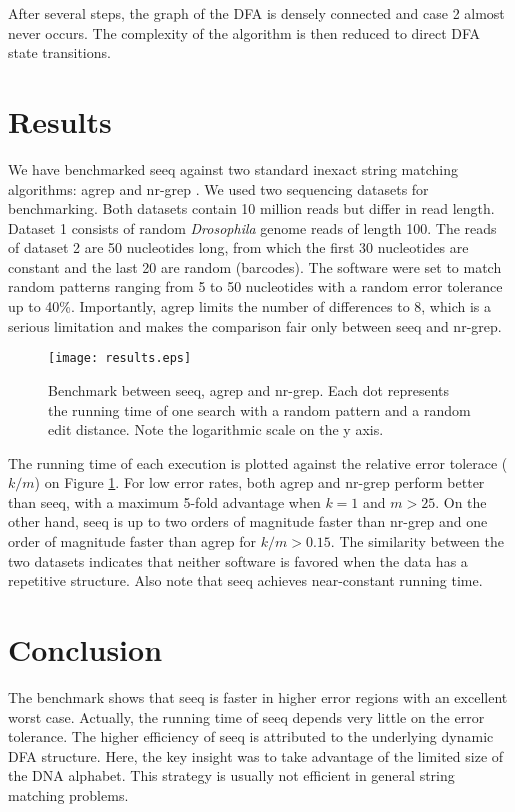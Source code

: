 \documentclass{bioinfo}
\begin{document}
\begin{methods}
After several steps, the graph of the DFA is densely connected and
case 2 almost never occurs. The complexity of the algorithm is then
reduced to direct DFA state transitions.

\end{methods}

\section{Results}

We have benchmarked seeq against two standard inexact string
matching algorithms: agrep \citep{Wu92} and nr-grep \citep{Nav01}. We
used two sequencing datasets for benchmarking. Both datasets contain
10 million reads but differ in read length. Dataset 1 consists of random
\textit{Drosophila} genome reads of length 100. The reads of dataset 2
are 50 nucleotides long, from which the first 30 nucleotides are constant
and the last 20 are random (barcodes). The software were set to match
random patterns ranging from 5 to 50 nucleotides with a random error
tolerance up to 40\%. Importantly, agrep limits the number of differences
to 8, which is a serious limitation and makes the comparison fair only
between seeq and nr-grep.

\begin{figure}[!tpb]
\centerline{\texttt{[image: results.eps]}}
\caption{Benchmark between seeq, agrep and nr-grep. Each dot represents
the running time of one search with a random pattern and a random
edit distance. Note the logarithmic scale on the y axis.}
\label{fig:results}
\end{figure}


The running time of each execution is plotted against the relative
error tolerace ($k/m$) on Figure \ref{fig:results}. For low error
rates, both agrep and nr-grep perform better than seeq, with a maximum
5-fold advantage when $k=1$ and $m > 25$. On the other hand, seeq is
up to two orders of magnitude faster than nr-grep and one order of
magnitude faster than agrep for $k/m > 0.15$. The similarity between
the two datasets indicates that neither software is favored when the
data has a repetitive structure. Also note that seeq 
achieves near-constant running time.

\section{Conclusion}

The benchmark shows that seeq is faster in higher error regions with
an excellent worst case. Actually, the running time of seeq depends
very little on the error tolerance. The higher efficiency of seeq
is attributed to the underlying dynamic DFA structure. Here, the key
insight was to take advantage of the limited size of the DNA alphabet.
This strategy is usually not efficient in general string matching
problems.
\end{document}
